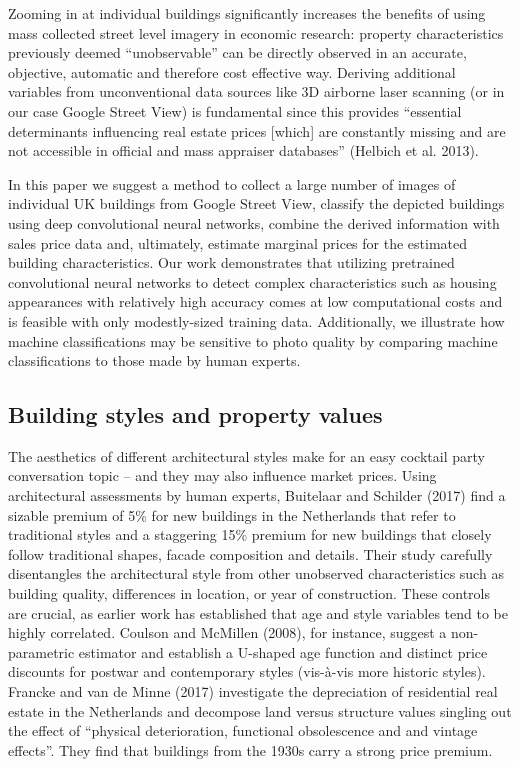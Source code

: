 \documentclass[]{article}
\begin{document}
Zooming in at individual buildings significantly increases the benefits
of using mass collected street level imagery in economic research:
property characteristics previously deemed ``unobservable'' can be
directly observed in an accurate, objective, automatic and therefore
cost effective way. Deriving additional variables from unconventional
data sources like 3D airborne laser scanning (or in our case Google
Street View) is fundamental since this provides ``essential determinants
influencing real estate prices {[}which{]} are constantly missing and
are not accessible in official and mass appraiser databases'' (Helbich
et al. 2013).

In this paper we suggest a method to collect a large number of images of
individual UK buildings from Google Street View, classify the depicted
buildings using deep convolutional neural networks, combine the derived
information with sales price data and, ultimately, estimate marginal
prices for the estimated building characteristics. Our work demonstrates
that utilizing pretrained convolutional neural networks to detect
complex characteristics such as housing appearances with relatively high
accuracy comes at low computational costs and is feasible with only
modestly-sized training data. Additionally, we illustrate how machine
classifications may be sensitive to photo quality by comparing machine
classifications to those made by human experts.

\hypertarget{building-styles-and-property-values}{%
\subsection{Building styles and property
values}\label{building-styles-and-property-values}}

The aesthetics of different architectural styles make for an easy
cocktail party conversation topic -- and they may also influence market
prices. Using architectural assessments by human experts, Buitelaar and
Schilder (2017) find a sizable premium of 5\% for new buildings in the
Netherlands that refer to traditional styles and a staggering 15\%
premium for new buildings that closely follow traditional shapes, facade
composition and details. Their study carefully disentangles the
architectural style from other unobserved characteristics such as
building quality, differences in location, or year of construction.
These controls are crucial, as earlier work has established that age and
style variables tend to be highly correlated. Coulson and McMillen
(2008), for instance, suggest a non-parametric estimator and establish a
U-shaped age function and distinct price discounts for postwar and
contemporary styles (vis-à-vis more historic styles). Francke and van de
Minne (2017) investigate the depreciation of residential real estate in
the Netherlands and decompose land versus structure values singling out
the effect of ``physical deterioration, functional obsolescence and and
vintage effects''. They find that buildings from the 1930s carry a
strong price premium.
\end{document}
